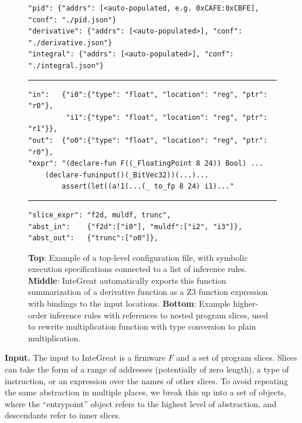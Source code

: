 
\lstset{language=json,basicstyle=\ttfamily\scriptsize}
\begin{figure}
\begin{lstlisting}
"pid": {"addrs": [<auto-populated, e.g. 0xCAFE:0xCBFE], "conf": "./pid.json"}
"derivative": {"addrs": [<auto-populated>], "conf": "./derivative.json"}
"integral": {"addrs": [<auto-populated>], "conf": "./integral.json"}
\end{lstlisting}
\vspace{5pt}
\hrule\vspace{5pt}
\begin{lstlisting}
"in":   {"i0":{"type": "float", "location": "reg", "ptr": "r0"},
         "i1":{"type": "float", "location": "reg", "ptr": "r1"}},
"out":  {"o0":{"type": "float", "location": "reg", "ptr": "r0"},
"expr": "(declare-fun F((_FloatingPoint 8 24)) Bool) ...
	(declare-funinput()(_BitVec32))(...)...
		assert(let((a!1(...(_ to_fp 8 24) i1)..."
\end{lstlisting}
\vspace{5pt}
\hrule\vspace{5pt}
\begin{lstlisting}
"slice_expr": "f2d, muldf, trunc",
"abst_in":    {"f2d":["i0"], "muldf":["i2", "i3"]},
"abst_out":   {"trunc":["o0"]},
\end{lstlisting}
	\caption{\textbf{Top}: Example of a top-level configuration file, with symbolic execution specifications connected to a list of inference rules. \textbf{Middle}: InteGreat automatically exports this function summarization of a derivative function as a Z3 function expression with bindings to the input locations. \textbf{Bottom}: Example higher-order inference rules with references to nested program slices, used to rewrite multiplication function with type conversion to plain multiplication.} 
\label{fig:json-example}
\end{figure}

\textbf{Input.}
\label{sec:input-output}
The input to InteGreat is a firmware $F$ and a set of program slices.
Slices can take the form of a range of addresses (potentially of zero length), a type of instruction, or an expression over the names of other slices.
To avoid repeating the same abstraction in multiple places, we break this up into a set of objects, where the ``entrypoint'' object refers to the highest level of abstraction, and descendants refer to inner slices.

